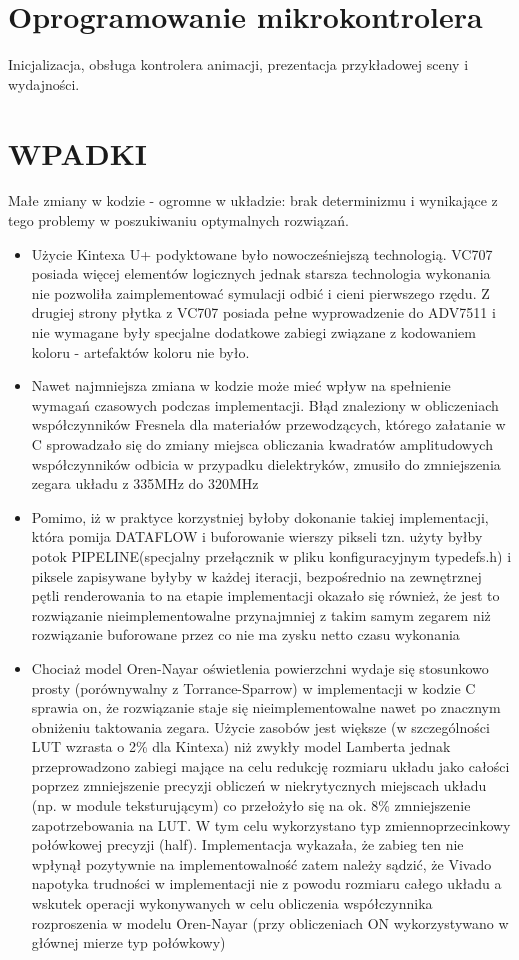 \section{Oprogramowanie mikrokontrolera}
Inicjalizacja, obsługa kontrolera animacji, prezentacja przykładowej sceny i wydajności.
\section{WPADKI}
Małe zmiany w kodzie - ogromne w układzie: brak determinizmu i wynikające z tego problemy w poszukiwaniu optymalnych rozwiązań.
\begin{itemize}
\item Użycie Kintexa U+ podyktowane było nowocześniejszą technologią. VC707 posiada więcej elementów logicznych jednak starsza technologia wykonania nie pozwoliła zaimplementować symulacji odbić i cieni pierwszego rzędu. Z drugiej strony płytka z VC707 posiada pełne wyprowadzenie do ADV7511 i nie wymagane były specjalne dodatkowe zabiegi związane z kodowaniem koloru - artefaktów koloru nie było.
\item Nawet najmniejsza zmiana w kodzie może mieć wpływ na spełnienie wymagań czasowych podczas implementacji. Błąd znaleziony w obliczeniach współczynników Fresnela dla materiałów przewodzących, którego załatanie w C sprowadzało się do zmiany miejsca obliczania kwadratów amplitudowych współczynników odbicia w przypadku dielektryków, zmusiło do zmniejszenia zegara układu z 335MHz do 320MHz
\item Pomimo, iż w praktyce korzystniej byłoby dokonanie takiej implementacji, która pomija DATAFLOW i buforowanie wierszy pikseli tzn. użyty byłby potok PIPELINE(specjalny przełącznik w pliku konfiguracyjnym typedefs.h) i piksele zapisywane byłyby w każdej iteracji, bezpośrednio na zewnętrznej pętli renderowania to na etapie implementacji okazało się również, że jest to rozwiązanie nieimplementowalne przynajmniej z takim samym zegarem niż rozwiązanie buforowane przez co nie ma zysku netto czasu wykonania
\item Chociaż model Oren-Nayar oświetlenia powierzchni wydaje się stosunkowo prosty (porównywalny z Torrance-Sparrow) w implementacji w kodzie C sprawia on, że rozwiązanie staje się nieimplementowalne nawet po znacznym obniżeniu taktowania zegara. Użycie zasobów jest większe (w szczególności LUT wzrasta o 2\% dla Kintexa) niż zwykły model Lamberta jednak przeprowadzono zabiegi mające na celu redukcję rozmiaru układu jako całości poprzez zmniejszenie precyzji obliczeń w niekrytycznych miejscach układu (np. w module teksturującym) co przełożyło się na ok. 8\% zmniejszenie zapotrzebowania na LUT. W tym celu wykorzystano typ zmiennoprzecinkowy połówkowej precyzji (half). Implementacja wykazała, że zabieg ten nie wpłynął pozytywnie na implementowalność zatem należy sądzić, że Vivado napotyka trudności w implementacji nie z powodu rozmiaru całego układu a wskutek operacji wykonywanych w celu obliczenia współczynnika rozproszenia w modelu Oren-Nayar (przy obliczeniach ON wykorzystywano w głównej mierze typ połówkowy)

\end{itemize}